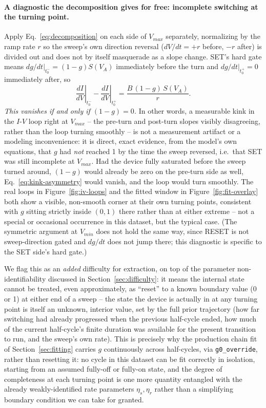\documentclass[11pt]{article}
\begin{document}
\paragraph{A diagnostic the decomposition gives for free: incomplete
switching at the turning point.} Apply Eq.~\eqref{eq:decomposition} on
each side of $V_{max}$ separately, normalizing by the ramp rate $r$ so the
sweep's own direction reversal ($dV/dt = +r$ before, $-r$ after) is
divided out and does not by itself masquerade as a slope change. SET's
hard gate means $dg/dt|_{t_0^-} = (1-g)S(V_A)$ immediately before the turn
and $dg/dt|_{t_0^+} = 0$ immediately after, so
\begin{equation}
\left.\frac{dI}{dV}\right|_{t_0^-} - \left.\frac{dI}{dV}\right|_{t_0^+}
= \frac{B\,(1-g)\,S(V_A)}{r}.
\label{eq:kink-asymmetry}
\end{equation}
\emph{This vanishes if and only if $(1-g)=0$.} In other words, a
measurable kink in the $I$-$V$ loop right at $V_{max}$ -- the pre-turn and
post-turn slopes visibly disagreeing, rather than the loop turning
smoothly -- is not a measurement artifact or a modeling inconvenience: it
is direct, exact evidence, from the model's own equations, that $g$ had
\emph{not} reached 1 by the time the sweep reversed, i.e.\ that SET was
still incomplete at $V_{max}$. Had the device fully saturated before the
sweep turned around, $(1-g)$ would already be zero on the pre-turn side as
well, Eq.~\eqref{eq:kink-asymmetry} would vanish, and the loop would turn
smoothly. The real loops in Figure~\ref{fig:iv-loops} and the fitted window
in Figure~\ref{fig:fit-overlay} both show a visible, non-smooth corner at
their own turning points, consistent with $g$ sitting strictly inside
$(0,1)$ there rather than at either extreme -- not a special or
occasional occurrence in this dataset, but the typical case. (The
symmetric argument at $V_{min}$ does not hold the same way, since RESET is
not sweep-direction gated and $dg/dt$ does not jump there; this diagnostic
is specific to the SET side's hard gate.)

We flag this as an \emph{added} difficulty for extraction, on top of the
parameter non-identifiability discussed in Section~\ref{sec:difficulty}:
it means the internal state cannot be treated, even approximately, as
``reset'' to a known boundary value (0 or 1) at either end of a sweep --
the state the device is actually in at any turning point is itself an
unknown, interior value, set by the full prior trajectory (how far
switching had already progressed when the previous half-cycle ended, how
much of the current half-cycle's finite duration was available for the
present transition to run, and the sweep's own rate). This is precisely
why the production chain fit of Section~\ref{sec:fitting} carries $g$
continuously across half-cycles, via \texttt{g0\_override}, rather than
resetting it: no cycle in this dataset can be fit correctly in isolation,
starting from an assumed fully-off or fully-on state, and the degree of
completeness at each turning point is one more quantity entangled with the
already weakly-identified rate parameters $\eta_s, \eta_r$ rather than a
simplifying boundary condition we can take for granted.
\end{document}
